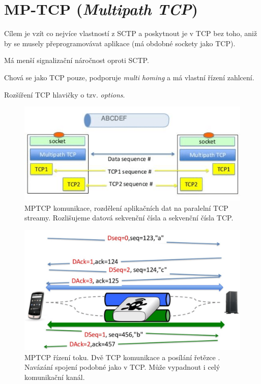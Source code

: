 
\section{MP-TCP (\textit{Multipath TCP})}

\begin{compactitem}
    \item Cílem je vzít co nejvíce vlastností z SCTP a poskytnout je v TCP bez toho, aniž by se musely přeprogramovávat aplikace (má obdobné sockety jako TCP).
    \item Má menší signalizační náročnost oproti SCTP.
    \item Chová se jako TCP pouze, podporuje \textit{multi homing} a má vlastní řízení zahlcení.
    \item Rozšíření TCP hlavičky o tzv. \textit{options}.
\end{compactitem}

\begin{figure}[H]
    \centering
    \includegraphics[width=1\linewidth]{mptcp_1.png}
    \caption{MPTCP komunikace, rozdělení aplikačních dat na paralelní TCP streamy. Rozlišujeme datová sekvenční čísla a sekvenční čísla TCP.}
\end{figure}

\begin{figure}[H]
    \centering
    \includegraphics[width=1\linewidth]{mptcp_rizeni_toku.png}
    \caption{MPTCP řízení toku. Dvě TCP komunikace a posílání řetězce . Navázání spojení podobné jako v TCP. Může vypadnout i celý komunikační kanál.}
\end{figure}

